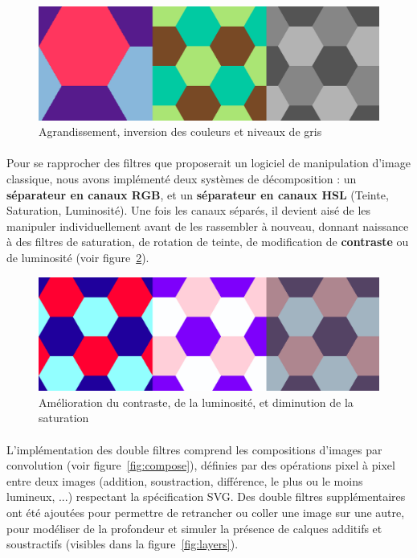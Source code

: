\documentclass[a4paper]{article}
\begin{document}
\begin{figure}
    \centering
    \includegraphics[width=0.8\columnwidth]{basicfil.png}
    \caption{Agrandissement, inversion des couleurs et niveaux de gris}
    \label{fig:basicfil}
\end{figure}

\paragraph{}
Pour se rapprocher des filtres que proposerait un logiciel de manipulation d'image classique, nous avons implémenté deux systèmes de décomposition : un \textbf{séparateur en canaux RGB}, et un \textbf{séparateur en canaux HSL}\cite{rgb2hsl} (Teinte, Saturation, Luminosité). Une fois les canaux séparés, il devient aisé de les manipuler individuellement avant de les rassembler à nouveau, donnant naissance à des filtres de saturation, de rotation de teinte, de modification de \textbf{contraste}\cite{contrast} ou de luminosité (voir figure~\ref{fig:colors}).

\begin{figure}
    \centering
    \includegraphics[width=0.8\columnwidth]{colors.png}
    \caption{Amélioration du contraste, de la luminosité, et diminution de la saturation}
    \label{fig:colors}
\end{figure}

\paragraph{}
L'implémentation des double filtres comprend les compositions d'images par convolution (voir figure~\ref{fig:compose}), définies par des opérations pixel à pixel entre deux images (addition, soustraction, différence, le plus ou le moins lumineux, ...) respectant la spécification SVG\cite{composition}. Des double filtres supplémentaires ont été ajoutées pour permettre de retrancher ou coller une image sur une autre, pour modéliser de la profondeur et simuler la présence de calques additifs et soustractifs (visibles dans la figure~\ref{fig:layers}).
\end{document}
